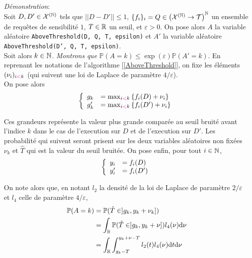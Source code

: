\textit{Démonstration}:\\
Soit \(D, D' \in \mathcal X^{(\mathbb{N})}\) tels que \(||D - D'|| \leq 1\), \(\{f_i\}_i = Q \in \left( \mathcal X^{(\mathbb{N})} \to  \mathcal T \right)^{\mathbb{N}}\) un ensemble de requêtes de sensibilité \(1\), \(T \in \mathbb{R}\) un seuil, et \(\varepsilon > 0\). On pose alors \(A\) la variable aléatoire \texttt{AboveThreshold(D, Q, T, epsilon)} et \(A'\) la variable aléatoire \texttt{AboveThreshold(D', Q, T, epsilon)}.\\

Soit alors \(k \in \mathbb{N}\). \textit{Montrons que \(\mathbb P (A = k) \leq \exp(\varepsilon)\mathbb P(A' = k)\)}. En reprenant les notations de l'algorithme [\ref{AboveThreshold}], on fixe les éléments \((\nu_i)_{i {\color{magenta} <} k}\) (qui suivent une loi de {\sc Laplace} de paramètre \(4/\varepsilon\)).\\


On pose alors
\[
    \left\{ 
        \begin{array}[]{rl}
            g_k & = \max_{i {\color{magenta} <} k} \left\{ f_i(D) + \nu_i\right\}\\
            g_k' & = \max_{i {\color{magenta} <} k} \left\{ f_i(D') + \nu_i\right\}\\
        \end{array}
    \right.    
\]

Ces grandeurs représente la valeur plus grande comparée au seuil bruité avant l'indice \(k\) dans le cas de l'execution sur \(D\) et de l'execution sur \(D'\). Les probabilité qui suivent seront prisent sur les deux variables aléatoires non fixées \(\nu_k\) et \(\hat T\) qui est la valeur du seuil bruitée. On pose enfin, pour tout \(i \in \mathbb{N}\),
\[
    \left\{ 
        \begin{array}[]{rl}
            y_i & = f_i(D)\\
            y_i' & = f_i(D')\\
        \end{array}
    \right.    
\]


On note alors que, en notant \(l_2\) la densité de la loi de {\sc Laplace} de paramètre \(2/\varepsilon\) et \(l_4\) celle de paramètre \(4/\varepsilon\),
\begin{align*}
    \mathbb P(A = k) & = \mathbb P(\hat T \in ]g_k, y_k + \nu_k])\\
    & = \int_{\mathbb{R}} \mathbb P(\hat T \in ]g_k, y_k + \nu])l_4(\nu) \mathrm{d} \nu \\
    & = \int_{\mathbb{R}}\int_{g_k - T}^{y_k + \nu - T} l_2(t)l_4(\nu) \mathrm{d} t \mathrm{d} \nu 
\end{align*}

